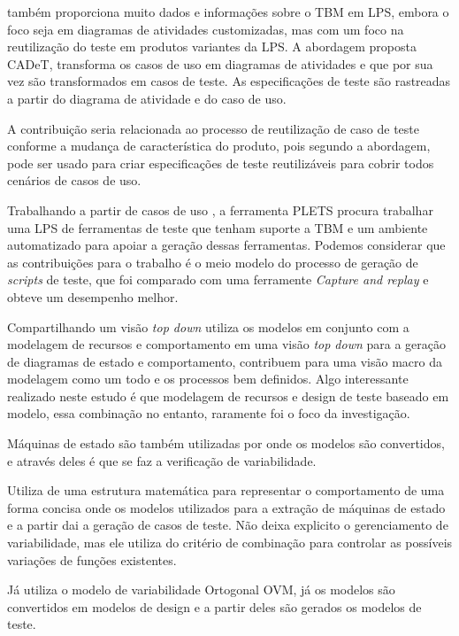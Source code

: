 \cite{olimpiew2008model} também proporciona muito dados e informações sobre o TBM em LPS, embora o foco seja em diagramas de atividades customizadas, mas com um foco na reutilização do teste em produtos variantes da LPS. A abordagem proposta CADeT, transforma os casos de uso em diagramas de atividades e que por sua vez são transformados em casos de teste. As especificações de teste são rastreadas a partir do diagrama de atividade e do caso de uso.

A contribuição seria relacionada ao processo de reutilização de caso de teste conforme a mudança de característica do produto, pois segundo a abordagem, pode ser usado para criar especificações de teste reutilizáveis para cobrir todos cenários de casos de uso.

Trabalhando a partir de casos de uso \cite{rodrigues2013plets}, a ferramenta PLETS procura trabalhar uma LPS de ferramentas de teste que tenham suporte a TBM e um ambiente automatizado para apoiar a geração dessas ferramentas. Podemos considerar que as contribuições para o trabalho é o meio modelo do processo de geração de \textit{scripts} de teste, que foi comparado com uma ferramente \textit{Capture and replay} e obteve um desempenho melhor.

Compartilhando um visão \textit{top down} \cite{weissleder2013top} utiliza os modelos em conjunto com a modelagem de recursos e comportamento em uma visão \textit{top down} para a geração de diagramas de estado e comportamento, contribuem para uma visão macro da modelagem como um todo e os processos bem definidos. Algo interessante realizado neste estudo é que modelagem de recursos e design de teste baseado em modelo, essa combinação no entanto, raramente foi o foco da investigação.

Máquinas de estado são também utilizadas por \cite{ali2012product} onde os modelos são convertidos, e através deles é que se faz a verificação de variabilidade.

\cite{devroey2014coverage}Utiliza de uma estrutura matemática para representar o comportamento de uma forma concisa onde os modelos utilizados para a extração de máquinas de estado e a partir dai a geração de casos de teste. Não deixa explicito o gerenciamento de variabilidade, mas ele utiliza do critério de combinação para controlar as possíveis variações de funções existentes.

Já \cite{lamancha2010model} utiliza o modelo de variabilidade Ortogonal OVM, já os modelos são convertidos em modelos de design e a partir deles são gerados os modelos de teste.

